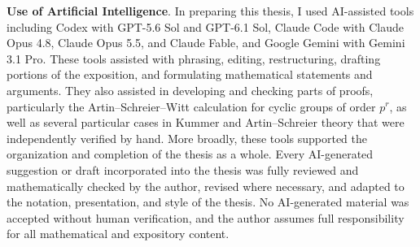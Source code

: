 \noindent \textbf{Use of Artificial Intelligence}. In preparing this thesis, I used AI-assisted tools including Codex with GPT-5.6 Sol and GPT-6.1 Sol, Claude Code with Claude Opus 4.8, Claude Opus 5.5, and Claude Fable, and Google Gemini with Gemini 3.1 Pro. These tools assisted with phrasing, editing, restructuring, drafting portions of the exposition, and formulating mathematical statements and arguments. They also assisted in developing and checking parts of proofs, particularly the Artin--Schreier--Witt calculation for cyclic groups of order $p^r$, as well as several particular cases in Kummer and Artin--Schreier theory that were independently verified by hand. More broadly, these tools supported the organization and completion of the thesis as a whole. Every AI-generated suggestion or draft incorporated into the thesis was fully reviewed and mathematically checked by the author, revised where necessary, and adapted to the notation, presentation, and style of the thesis. No AI-generated material was accepted without human verification, and the author assumes full responsibility for all mathematical and expository content.


